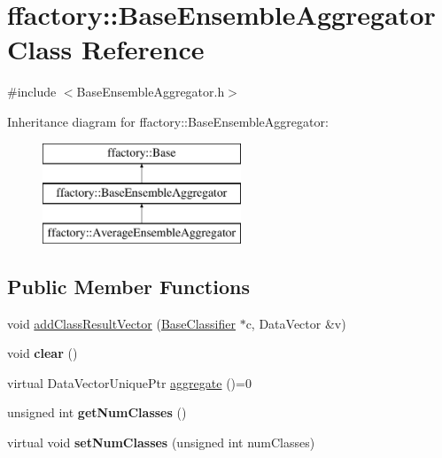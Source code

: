 \hypertarget{classffactory_1_1_base_ensemble_aggregator}{\section{ffactory\-:\-:Base\-Ensemble\-Aggregator Class Reference}
\label{classffactory_1_1_base_ensemble_aggregator}
}


{\ttfamily \#include $<$Base\-Ensemble\-Aggregator.\-h$>$}

Inheritance diagram for ffactory\-:\-:Base\-Ensemble\-Aggregator\-:\begin{figure}[H]
\begin{center}
\leavevmode
\includegraphics[height=3.000000cm]{classffactory_1_1_base_ensemble_aggregator}
\end{center}
\end{figure}
\subsection*{Public Member Functions}
\begin{DoxyCompactItemize}
\item 
void \hyperlink{classffactory_1_1_base_ensemble_aggregator_aa2dfb6aeef64ec84248b57966afc3fbd}{add\-Class\-Result\-Vector} (\hyperlink{classffactory_1_1_base_classifier}{Base\-Classifier} $\ast$c, Data\-Vector \&v)
\item 
\hypertarget{classffactory_1_1_base_ensemble_aggregator_a4de82c0fa84c84daeb6798bbcdbe274b}{void {\bfseries clear} ()}\label{classffactory_1_1_base_ensemble_aggregator_a4de82c0fa84c84daeb6798bbcdbe274b}

\item 
virtual Data\-Vector\-Unique\-Ptr \hyperlink{classffactory_1_1_base_ensemble_aggregator_a502352ca8f06449a0abc06f9381a6dc7}{aggregate} ()=0
\item 
\hypertarget{classffactory_1_1_base_ensemble_aggregator_a8a656e1521debd9cc3f10450d28457a4}{unsigned int {\bfseries get\-Num\-Classes} ()}\label{classffactory_1_1_base_ensemble_aggregator_a8a656e1521debd9cc3f10450d28457a4}

\item 
\hypertarget{classffactory_1_1_base_ensemble_aggregator_abc67844972315db87526c59be1b5f321}{virtual void {\bfseries set\-Num\-Classes} (unsigned int num\-Classes)}\label{classffactory_1_1_base_ensemble_aggregator_abc67844972315db87526c59be1b5f321}

\end{DoxyCompactItemize}
